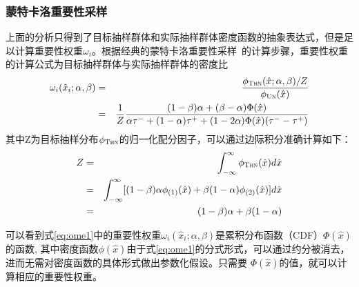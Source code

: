 \subsubsection{蒙特卡洛重要性采样}
上面的分析只得到了目标抽样群体和实际抽样群体密度函数的抽象表达式，但是足以计算重要性权重$\omega_i$。根据经典的蒙特卡洛重要性采样~\cite{Hesterberg:1988,Bengio:2008:TNN}的计算步骤，重要性权重的计算公式为目标抽样群体与实际抽样群体的密度比
\begin{eqnarray}
	\omega_i(\hat x_i;\alpha, \beta)&=& \frac{\phi_\textsc{Thn}(\hat{x};\alpha, \beta)/Z}{\phi_{\textsc{Un}}(\hat{x})} \label{eq:ome} \\
	&=& \frac{1}{Z} \frac{(1-\beta)\alpha + (\beta-\alpha)\Phi(\hat{x})}{\alpha\tau^- + (1- \alpha)\tau^+  + (1-2\alpha)\Phi(\hat{x})(\tau^- -\tau^+)}  \label{eq:ome1}
\end{eqnarray}
其中Z为目标抽样分布$\phi_\textsc{Thn}$的归一化配分因子，可以通过边际积分准确计算如下：
\begin{eqnarray}
	Z &=& \int_{ - \infty } ^{\infty} \phi_{\textsc{Thn}}(\hat{x})  d \hat{x} \nonumber \\
	&=& \int_{-\infty}^{\infty}  [(1-\beta)\alpha  \phi_{(1)}(\hat{x}) +\beta (1-\alpha)  \phi_{(2)}(\hat{x})]  d \hat{x} \nonumber \\
	&=& (1-\beta)\alpha + \beta (1-\alpha)
\end{eqnarray}

可以看到式\eqref{eq:ome1}中的重要性权重$\omega_i(\hat x_i;\alpha, \beta)$是累积分布函数（CDF）$\Phi (\hat{x})$的函数, 其中密度函数$\phi{(\hat{x})}$由于式\eqref{eq:ome1}的分式形式，可以通过约分被消去，进而无需对密度函数的具体形式做出参数化假设。只需要
$\Phi (\hat{x})$的值，就可以计算相应的重要性权重。

